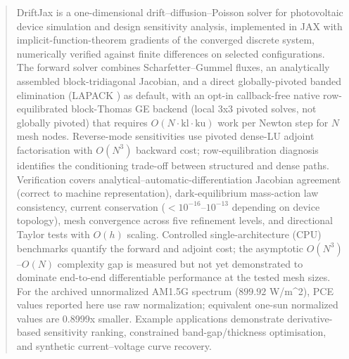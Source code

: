 \begin{abstract}
DriftJax is a one-dimensional drift--diffusion--Poisson solver for
photovoltaic device simulation and design sensitivity analysis, implemented
in JAX with implicit-function-theorem gradients of the converged discrete
system, numerically verified against finite differences on selected
configurations. The forward
solver combines Scharfetter--Gummel fluxes, an analytically assembled
block-tridiagonal Jacobian, and a direct globally-pivoted banded elimination
(LAPACK ) as default, with an opt-in callback-free native row-equilibrated block-Thomas GE backend (local 3x3
pivoted solves, not globally pivoted) that requires $O(N\cdot\mathrm{kl}\cdot
\mathrm{ku})$ work per Newton step for $N$ mesh nodes. Reverse-mode
sensitivities use pivoted dense-LU adjoint factorisation with
$O(N^3)$ backward cost; row-equilibration diagnosis identifies the
 conditioning trade-off between structured and dense paths.
Verification covers analytical--automatic-differentiation Jacobian
agreement (correct to machine representation), dark-equilibrium mass-action
law consistency, current conservation ($<10^{-16}$--$10^{-13}$ depending on device topology), mesh convergence
across five refinement levels, and directional Taylor tests with
$O(h)$ scaling. Controlled single-architecture (CPU) benchmarks quantify the
forward and adjoint cost; the asymptotic $O(N^3)$--$O(N)$
complexity gap is measured but not yet demonstrated to
dominate end-to-end differentiable performance at the
tested mesh sizes. For the archived unnormalized AM1.5G spectrum ($899.92$ W/m^2), PCE values
reported here use raw normalization; equivalent one-sun normalized values are
0.8999x smaller. Example applications demonstrate derivative-based sensitivity ranking, constrained
band-gap/thickness optimisation, and synthetic current--voltage
curve recovery.
\end{abstract}
